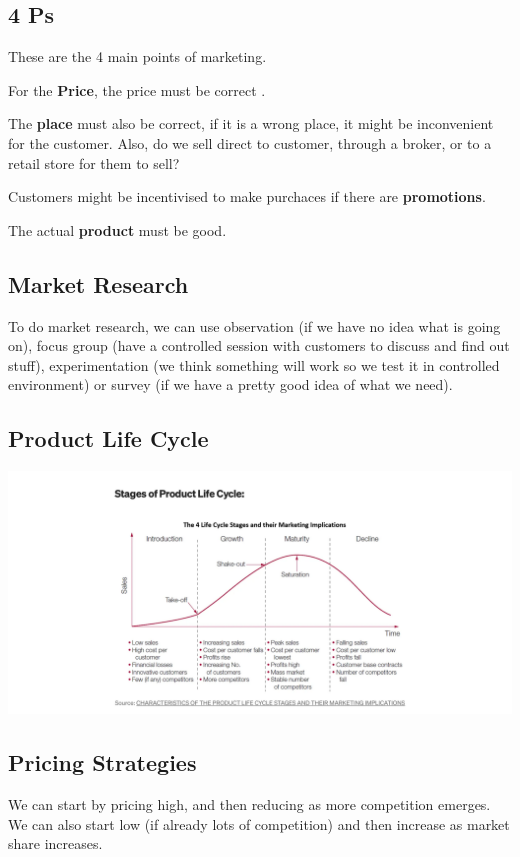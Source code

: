 \documentclass[12pt,letterpaper]{article} \usepackage{amsmath} \usepackage{graphicx} \usepackage[margin=1in]{geometry} \usepackage{longtable}  \usepackage{amssymb}
\begin{document}
		\subsection{4 Ps}
		These are the 4 main points of marketing. 
		
		For the \textbf{Price}, the price must be correct .
		
		The \textbf{place} must also be correct, if it is a wrong place, it might be inconvenient for the customer. Also, do we sell direct to customer, through a broker, or to a retail store for them to sell?
		
		Customers might be incentivised to make purchaces if there are \textbf{promotions}.
		
		The actual \textbf{product} must be good. 
		
		\subsection{Market Research}
		To do market research, we can use observation (if we have no idea what is going on), focus group (have a controlled session with customers to discuss and find out stuff), experimentation (we think something will work so we test it in controlled environment) or survey (if we have a pretty good idea of what we need).
		
		\subsection{Product Life Cycle}
		\begin{center}
			\includegraphics[width=0.9\linewidth]{screenshot002}
		\end{center}

		\subsection{Pricing Strategies}
		We can start by pricing high, and then reducing as more competition emerges. We can also start low (if already lots of competition) and then increase as market share increases.
		
\end{document}
